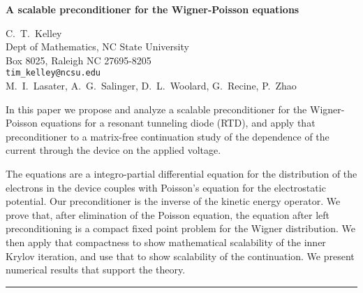 \documentclass[twosided]{report}
\begin{document}
\begin{center}
{\large			%
{\bf A scalable preconditioner for the Wigner-Poisson equations}}

	C.~T.~Kelley \\
	Dept of Mathematics, NC State University \\
	Box 8025, Raleigh NC 27695-8205 \\
	{\tt tim\_kelley@ncsu.edu} \\
	M.~I.~Lasater, A.~G.~Salinger,
	D.~L.~Woolard, G.~Recine, P.~Zhao
\end{center}
In this paper we propose and analyze a scalable
preconditioner for the Wigner-Poisson equations for a
resonant tunneling diode (RTD), and apply that
preconditioner to a matrix-free continuation study of the
dependence of the current through the device on the applied
voltage.

The equations are a integro-partial differential
equation for the distribution of the electrons in the device
couples with Poisson's equation for the electrostatic
potential. Our preconditioner is the inverse of the kinetic
energy operator. We prove that, after elimination of the
Poisson equation, the equation after left preconditioning is
a compact fixed point problem for the Wigner distribution.
We then apply that compactness to show mathematical
scalability of the inner Krylov iteration, and use that to
show scalability of the continuation. We present numerical
results that support the theory.



	\begin{center} \rule{6in}{1pt} \end{center}
\end{document}
